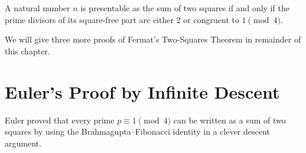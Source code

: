 \begin{theorem}\label{theorem:two-squares-theorem}
  A natural number $n$ is presentable as the sum of two squares if and only if the prime divisors of its square-free part are either $2$ or congruent to $1\pmod{4}$.
\end{theorem}

We will give three more proofs of Fermat's Two-Squares Theorem in remainder of this chapter.

\section{Euler's Proof by Infinite Descent}

Euler proved that every prime $p\equiv 1\pmod{4}$ can be written as a sum of two squares by using the Brahmagupta--Fibonacci identity in a clever descent argument.

